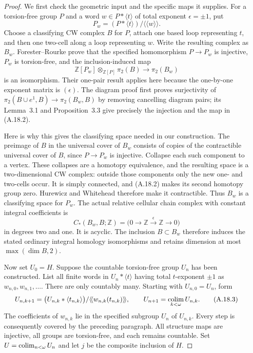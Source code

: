 \begin{proof}
We first check the geometric input and the specific maps it supplies.
For a torsion-free group $P$ and a word $w\in P*\langle t\rangle$
of total exponent $\epsilon=\pm1$, put
\[
 P_w=(P*\langle t\rangle)/\langle\!\langle w\rangle\!\rangle.
\]
Choose a classifying CW complex $B$ for $P$, attach one based loop
representing $t$, and then one two-cell along a loop representing $w$.
Write the resulting complex as $B_w$. Forester--Rourke
\cite[Theorem~1 and Proposition~1]{CpathsForesterRourke2005Adjunction}
prove that the specified homomorphism $P\to P_w$ is injective,
$P_w$ is torsion-free, and the inclusion-induced map
\[
 \mathbb Z[P_w]\otimes_{\mathbb Z[P]}\pi_2(B)
       \longrightarrow \pi_2(B_w)
 \tag{A.18.2}
\]
is an isomorphism. Their one-pair result applies here because the
one-by-one exponent matrix is $(\epsilon)$. The diagram proof
\cite[\S\S1--3]{CpathsForesterRourkeDiagrams}
first proves surjectivity of
$\pi_2(B\cup e^1,B)\to\pi_2(B_w,B)$ by removing cancelling
diagram pairs; its Lemma~3.1 and Proposition~3.3 give precisely
the injection and the map in (A.18.2).

Here is why this gives the classifying space needed in our construction.
The preimage of $B$ in the universal cover of $B_w$ consists of copies
of the contractible universal cover of $B$, since $P\to P_w$ is
injective. Collapse each such component to a vertex. These collapses
are a homotopy equivalence, and the resulting space is a
two-dimensional CW complex: outside those components only the new
one- and two-cells occur. It is simply connected, and (A.18.2)
makes its second homotopy group zero. Hurewicz and Whitehead
therefore make it contractible. Thus $B_w$ is a classifying
space for $P_w$. The actual relative cellular chain complex
with constant integral coefficients is
\[
 C_*(B_w,B;\mathbb Z)
       =\bigl(0\longrightarrow\mathbb Z
           \xrightarrow{\epsilon}\mathbb Z\longrightarrow0\bigr)
\]
in degrees two and one. It is acyclic. The inclusion $B\subset B_w$
therefore induces the stated ordinary integral homology isomorphisms
and retains dimension at most $\max(\dim B,2)$.

Now set $U_0=H$. Suppose the countable torsion-free group $U_n$
has been constructed. List all finite words in
$U_n*\langle t\rangle$ having total $t$-exponent $\pm1$ as
$w_{n,0},w_{n,1},\ldots$. There are only countably many. Starting
with $U_{n,0}=U_n$, form
\[
 U_{n,k+1}
  =\bigl(U_{n,k}*\langle t_{n,k}\rangle\bigr)/
     \langle\!\langle w_{n,k}(t_{n,k})\rangle\!\rangle,
 \qquad
 U_{n+1}=\mathop{\rm colim}_{k<\omega}U_{n,k}.
 \tag{A.18.3}
\]
The coefficients of $w_{n,k}$ lie in the specified subgroup $U_n$
of $U_{n,k}$. Every step is consequently covered by the preceding
paragraph. All structure maps are injective, all groups are
torsion-free, and each remains countable. Set
$U=\mathop{\rm colim}_{n<\omega}U_n$ and let $j$ be the composite
inclusion of $H$.


\end{proof}
